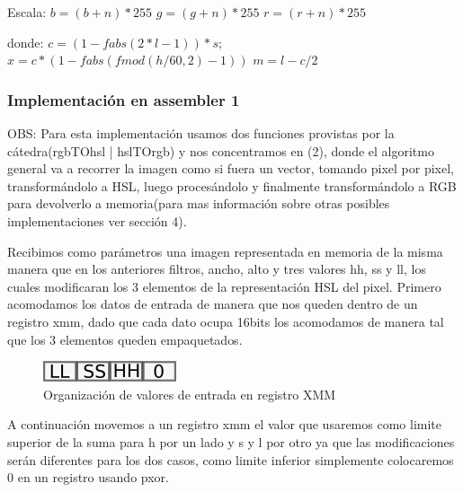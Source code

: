 \documentclass[a4paper]{article}
\begin{document}
\begin{enumerate}
		Escala:\newline
		$b = (b+n) * 255$\newline
		$g = (g+n) * 255$\newline
		$r = (r+n) * 255$\newline

		donde:\newline
		$c = ( 1 - fabs( 2*l - 1 )) * s;$\newline
		$x = c * ( 1 - fabs( fmod( h/60, 2 ) - 1 ) )$\newline
		$m = l - c / 2$\newline


\end{enumerate}

\subsubsection{Implementación en assembler 1}
OBS: Para esta implementación usamos dos funciones provistas por la cátedra(rgbTOhsl | hslTOrgb) y nos concentramos en (2), donde el algoritmo general va a recorrer la imagen como si fuera un vector, tomando pixel por pixel, transformándolo a HSL, luego procesándolo y finalmente transformándolo a RGB para devolverlo a memoria(para mas información sobre otras posibles implementaciones ver sección 4).



Recibimos como parámetros una imagen representada en memoria de la misma manera que en los anteriores filtros, ancho, alto y tres valores hh, ss y ll, los cuales modificaran los 3 elementos de la representación HSL del pixel.
Primero acomodamos los datos de entrada de manera que nos queden dentro de un registro xmm, dado que cada dato ocupa 16bits los acomodamos de manera tal que los 3 elementos queden empaquetados.

\begin{figure}[H]
\centering
\includegraphics[scale=0.8]{imagenes/llsshh.png}
\caption{Organización de valores de entrada en registro XMM}
\label{lshValue6}
\end{figure}

A continuación movemos a un registro xmm el valor que usaremos como limite superior de la suma para h por un lado y s y l por otro ya que las modificaciones serán diferentes para los dos casos, como limite inferior simplemente colocaremos 0 en un registro usando pxor.
\end{document}
